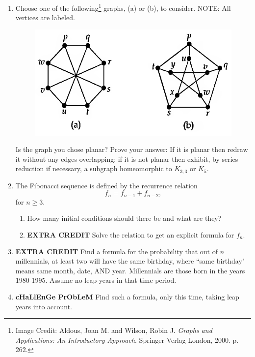 \documentclass[12pt,letterpaper]{article}
\begin{document}
\begin{enumerate}
\newpage
\item Choose one of the following\footnote{Image Credit: Aldous, Joan M. and Wilson, Robin J. {\it Graphs and Applications: An Introductory Approach}.  Springer-Verlag London, 2000. p. 262.} graphs, (a) or (b), to consider.  NOTE: All vertices are labeled.  
\vspace{-1pc}  
\begin{figure}[h]
\begin{center}
\includegraphics*[scale=0.6]{Exam3AldousPlanar.png}
\end{center}
\end{figure}
\vspace{-1pc}

Is the graph you chose planar?  Prove your answer: If it is planar then redraw it without any edges overlapping; if it is not planar then exhibit, by series reduction if necessary, a subgraph homeomorphic to $K_{3,3}$ or $K_5$.

\newpage
\item The Fibonacci sequence is defined by the recurrence relation
\[f_n=f_{n-1}+f_{n-2},\]
for $n\geq 3$.
\begin{enumerate}
\item How many initial conditions should there be and what are they?

\vspace{5pc}
\item {\bf EXTRA CREDIT} Solve the relation to get an explicit formula for $f_n$.
\end{enumerate}

\newpage
\item {\bf EXTRA CREDIT}  Find a formula for the probability that out of $n$ millennials, at least two will have the same birthday, where ``same birthday" means same month, date, AND year.  Millennials are those born in the years 1980-1995.  Assume no leap years in that time period.

\vspace{25pc}
\item {\bf cHaLlEnGe PrObLeM}  Find such a formula, only this time, taking leap years into account.

\end{enumerate}
\end{document}

